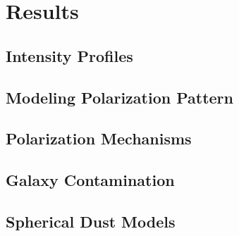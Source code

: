 \chapter{Results}
\label{ch_results}



\section{Intensity Profiles}



\section{Modeling Polarization Pattern}




\section{Polarization Mechanisms}



\section{Galaxy Contamination}




\section{Spherical Dust Models}
